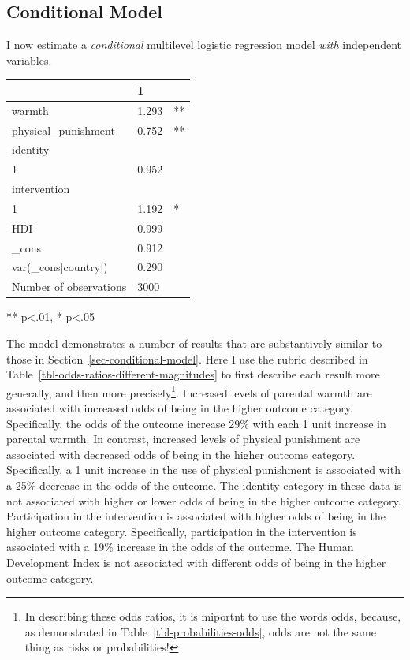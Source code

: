 \documentclass[
  letterpaper,
  DIV=11,
  numbers=noendperiod]{scrreprt}
\begin{document}
\subsection{Conditional Model}\label{sec-conditional-logistic}

I now estimate a \emph{conditional} multilevel logistic regression model
\emph{with} independent variables.

\begin{longtable}[]{@{}lll@{}}
\toprule\noalign{}
& 1 & \\
\midrule\noalign{}
\endhead
\bottomrule\noalign{}
\endlastfoot
warmth & 1.293 & ** \\
physical\_punishment & 0.752 & ** \\
identity & & \\
1 & 0.952 & \\
intervention & & \\
1 & 1.192 & * \\
HDI & 0.999 & \\
\_cons & 0.912 & \\
var(\_cons{[}country{]}) & 0.290 & \\
Number of observations & 3000 & \\
\end{longtable}

** p\textless.01, * p\textless.05

The model demonstrates a number of results that are substantively
similar to those in Section~\ref{sec-conditional-model}. Here I use the
rubric described in Table~\ref{tbl-odds-ratios-different-magnitudes} to
first describe each result more generally, and then more
precisely\footnote{In describing these odds ratios, it is miportnt to
  use the words odds, because, as demonstrated in
  Table~\ref{tbl-probabilities-odds}, odds are not the same thing as
  risks or probabilities!}. Increased levels of parental warmth are
associated with increased odds of being in the higher outcome category.
Specifically, the odds of the outcome increase 29\% with each 1 unit
increase in parental warmth. In contrast, increased levels of physical
punishment are associated with decreased odds of being in the higher
outcome category. Specifically, a 1 unit increase in the use of physical
punishment is associated with a 25\% decrease in the odds of the
outcome. The identity category in these data is not associated with
higher or lower odds of being in the higher outcome category.
Participation in the intervention is associated with higher odds of
being in the higher outcome category. Specifically, participation in the
intervention is associated with a 19\% increase in the odds of the
outcome. The Human Development Index is not associated with different
odds of being in the higher outcome category.
\end{document}

